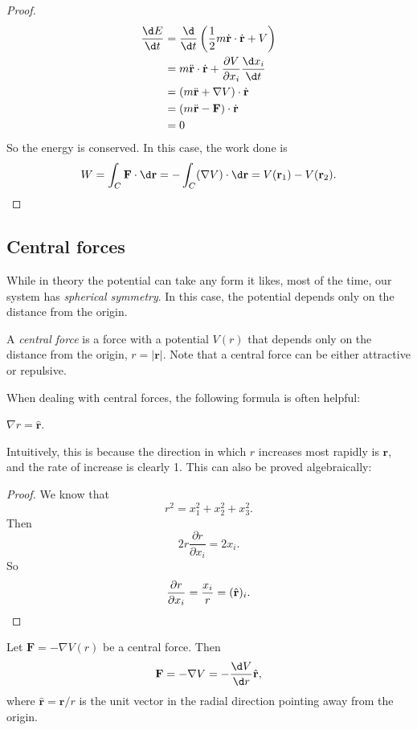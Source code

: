 \documentclass[a4paper]{article}
\begin{document}
\begin{proof}
  \begin{align*}
    \frac{\d E}{\d t} &= \frac{\d}{\d t}\left(\frac{1}{2}m\dot{\mathbf{r}}\cdot \dot{\mathbf{r}} + V\right)\\
    &= m\ddot{\mathbf{r}}\cdot \dot{\mathbf{r}} + \frac{\partial V}{\partial x_i}\frac{\d x_i}{\d t}\\
    &= (m\ddot{\mathbf{r}} + \nabla V)\cdot \dot{\mathbf{r}}\\
    &= (m\ddot{\mathbf{r}} - \mathbf{F})\cdot \dot{\mathbf{r}}\\
    &= 0
  \end{align*}
  So the energy is conserved. In this case, the work done is
  \[
    W = \int_C \mathbf{F}\cdot \d \mathbf{r} = -\int_C (\nabla V)\cdot \d \mathbf{r} = V(\mathbf{r}_1) - V(\mathbf{r}_2).\qedhere
  \]
\end{proof}
\subsection{Central forces}
While in theory the potential can take any form it likes, most of the time, our system has \emph{spherical symmetry}. In this case, the potential depends only on the distance from the origin.
\begin{defi}
  A \emph{central force} is a force with a potential $V(r)$ that depends only on the distance from the origin, $r = |\mathbf{r}|$. Note that a central force can be either attractive or repulsive.
\end{defi}

When dealing with central forces, the following formula is often helpful:
\begin{prop}
  $\nabla r = \hat{\mathbf{r}}$.
\end{prop}
Intuitively, this is because the direction in which $r$ increases most rapidly is $\mathbf{r}$, and the rate of increase is clearly 1. This can also be proved algebraically:

\begin{proof}
  We know that
  \[
    r^2 = x_1^2 + x_2^2 + x_3^2.
  \]
  Then
  \[
    2r\frac{\partial r}{\partial x_i} = 2x_i.
  \]
  So
  \[
    \frac{\partial r}{\partial x_i} = \frac{x_i}{r} = (\hat{\mathbf{r}})_i.\qedhere
  \]
\end{proof}

\begin{prop}
  Let $\mathbf{F} = -\nabla V(r)$ be a central force. Then
  \[
    \mathbf{F} = -\nabla V = -\frac{\d V}{\d r} \hat{\mathbf{r}},
  \]
  where $\hat{\mathbf{r}} = \mathbf{r}/r$ is the unit vector in the radial direction pointing away from the origin.
\end{prop}
\end{document}
